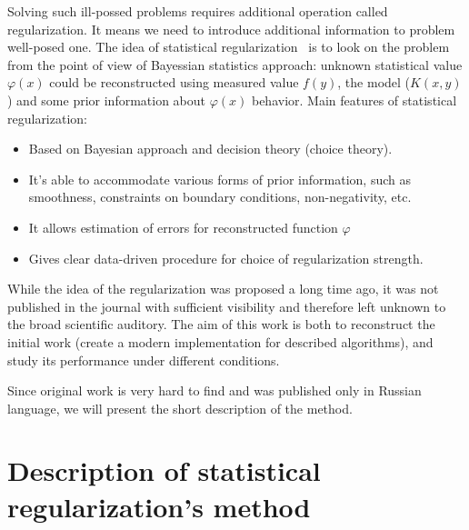 \documentclass{webofc}
\begin{document}
Solving such ill-possed problems requires additional operation called regularization. It means we need to introduce additional information to problem well-posed one. The idea of statistical regularization~\cite{Turchin, Turovceva} is to look on the problem from the point of view of Bayessian statistics approach: unknown statistical value $\varphi(x)$ could be reconstructed using  measured value $f(y)$, the model ($K(x,y)$) and some prior information about $\varphi(x)$ behavior. Main features of statistical regularization:
\begin{itemize}
    \item Based on Bayesian approach and decision theory (choice theory).
    \item It's able to accommodate various forms of prior information, such as
      smoothness, constraints on boundary conditions, non-negativity, etc.
    \item It allows estimation of errors for reconstructed function $\varphi$
    \item Gives clear data-driven procedure for choice of regularization
      strength.
\end{itemize}

While the idea of the regularization was proposed a long time ago, it was not published in the journal with sufficient visibility and therefore left unknown to the broad scientific auditory. The aim of this work is both to reconstruct the initial work (create a modern implementation for described algorithms), and study its performance under different conditions.

Since original work is very hard to find and was published only in Russian language, we will present the short description of the method.

\section{Description of statistical regularization's method}
\end{document}
